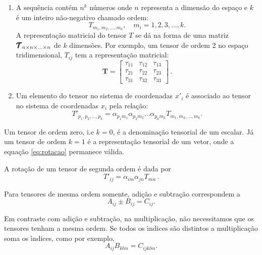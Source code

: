\begin{enumerate}
  \item A sequ\^encia cont\'em $n^{k}$ n\'umeros onde $n$ representa a
dimens\~ao do espa\c{c}o e $k$ \'e um inteiro n\~ao-negativo
chamado ordem:
\begin{equation}
T_{m_{1},m_{2},...,m_{k}}, \quad m_{i}=1,2,3,\dots, k.
\end{equation}
    A representa\c{c}\~ao matricial do tensor $T$ se d\'a na forma de uma matriz
    $\pmb{\cal{T}}_{n\times n\times ...\times n}$ de $k$ dimens\~oes. Por exemplo, um tensor de
    ordem 2 no espa\c{c}o tridimensional, $T_{ij}$ tem a representa\c{c}\~ao matricial:
    \begin{equation}
      \pmb{T} =
      \begin{bmatrix}
        \tau_{11} & \tau_{12} &\tau_{13} \\
        \tau_{21} & \tau_{22} &\tau_{23} \\
        \tau_{31} & \tau_{32} &\tau_{33} 
      \end{bmatrix}
      \, .
    \end{equation}

\item Um elemento do tensor no sistema de coordenadas $x'_{i}$ \'e
associado ao tensor no sistema de coordenadas $x_{i}$ pela
rela\c{c}\~ao:
\begin{equation}
T'_{p_{1},p_{2},\dots,p_{k}}=
\alpha_{p_{1}m_{1}}\alpha_{p_{2}m_{2}}\dots\alpha_{p_{k}m_{k}}T_{m_{1},m_{2},\dots,m_{k}}.
\end{equation}
\end{enumerate}


Um tensor de ordem zero, i.e $k=0$, \'e a denomina\c{c}\~ao tensorial de um
escalar. J\'a um tensor de ordem $k=1$ \'e a representa\c{c}\~ao tensorial de um
vetor, onde a equa\c{c}\~ao \ref{eq:rotacao} permanece v\'alida.

A rota\c{c}\~ao de um tensor de segunda ordem \'e dada por
\begin{equation}
T'_{ij}=\alpha_{im}\alpha_{jn}T_{mn} \, .
\end{equation}

Para tensores de mesma ordem somente, adi\c{c}\~ao e subtra\c{c}\~ao
correspondem a
\begin{equation}
A_{ij} \pm B_{ij}=C_{ij}.
\end{equation}


Em contraste com adi\c{c}\~ao e subtra\c{c}\~ao, na multiplica\c{c}\~ao, n\~ao
necessitamos que os tensores tenham a
mesma ordem. Se todos os \'\i ndices s\~ao distintos a
multiplica\c{c}\~ao soma os \'\i ndices, como por exemplo,
\begin{equation}
A_{ij}B_{klm}=C_{ijklm}.
\end{equation}

